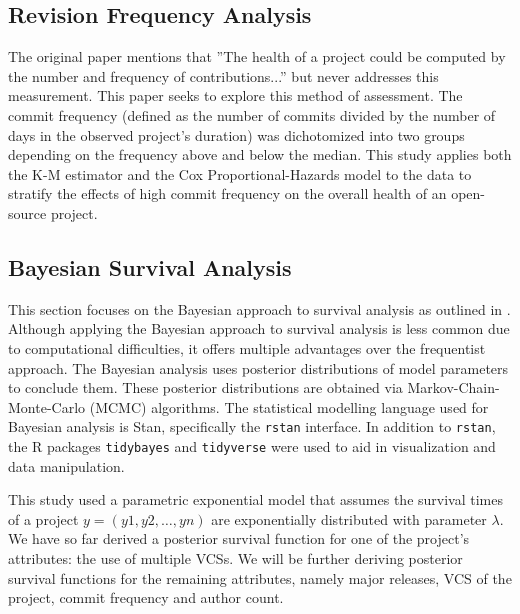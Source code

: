 \documentclass[acmconf]{acmart}
\begin{document}
\subsection{Revision Frequency Analysis}

The original paper mentions that ''The health of a project could be computed by the number and frequency of contributions...'' but never addresses this measurement.
This paper seeks to explore this method of assessment. 
The commit frequency (defined as the number of commits divided by the number of days in the observed project's duration) was dichotomized into two groups depending on the frequency above and below the median. 
This study applies both the K-M estimator and the Cox Proportional-Hazards model to the data to stratify the effects of high commit frequency on the overall health of an open-source project.

\subsection{Bayesian Survival Analysis}

This section focuses on the Bayesian approach to survival analysis as outlined in \cite{kelter2020bayesian}. 
Although applying the Bayesian approach to survival analysis is less common due to computational difficulties, it offers multiple advantages over the frequentist approach. 
The Bayesian analysis uses posterior distributions of model parameters to conclude them. 
These posterior distributions are obtained via Markov-Chain-Monte-Carlo (MCMC) algorithms. 
The statistical modelling language used for Bayesian analysis is Stan, specifically the \lstinline!rstan! interface. In addition to \lstinline!rstan!, the R packages \lstinline[language=R]!tidybayes! and \lstinline[language=R]!tidyverse! were used to aid in visualization and data manipulation.

This study used a parametric exponential model that assumes the survival times of a project $y = (y1, y2, \dots , yn)$ are exponentially distributed with parameter $\lambda$.
We have so far derived a posterior survival function for one of the project's attributes: the use of multiple VCSs. 
We will be further deriving posterior survival functions for the remaining attributes, namely major releases, VCS of the project, commit frequency and author count. 
\end{document}
